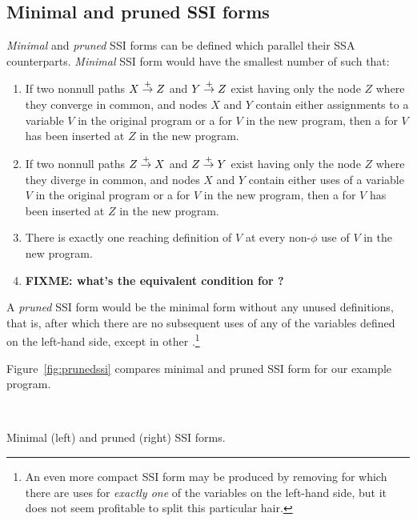 \documentclass[12pt,titlepage]{article}
\begin{document}
\subsection{Minimal and pruned SSI forms}
\emph{Minimal} and \emph{pruned} SSI forms can be defined which
parallel their SSA counterparts.  \emph{Minimal} SSI form would have the
smallest number of  such that:
\begin{enumerate}
\item If two nonnull paths $X \stackrel{+}{\rightarrow} Z$ and $Y \stackrel{+}{\rightarrow} Z$
exist having only the node $Z$ where they converge in common,
and nodes $X$ and $Y$ contain either assignments to a variable $V$ in the
original program or a \phisigfunction[or] for $V$ in the new program,
then a \phifunction{} for $V$ has been inserted at $Z$ in the new program.
\item If two nonnull paths $Z \stackrel{+}{\rightarrow} X$ and $Z \stackrel{+}{\rightarrow} Y$
exist having only the node $Z$ where they diverge in common,
and nodes $X$ and $Y$ contain either uses of a variable $V$ in the
original program or a \phisigfunction[or] for $V$ in the new program,
then a \sigfunction{} for $V$ has been inserted at $Z$ in the new program.
\item There is exactly one reaching definition of $V$ at every
non-$\phi$ use of $V$ in the new program.
\item \textbf{FIXME: what's the equivalent condition for ?}
\end{enumerate}

A \emph{pruned} SSI form would be the minimal form without any unused
definitions, that is,  after which there are no
subsequent uses of any of the variables defined on the left-hand side,
except in other .\footnote{An even more
compact SSI form may be produced by removing  for which
there are uses for \emph{exactly one} of the variables on the
left-hand side, but it does not seem profitable to split this
particular hair.}

Figure~\vref{fig:prunedssi} compares minimal and pruned SSI form for
our example program.
\begin{myfigure}
\begin{center}
 \vline\ 
\end{center}
\caption[Minimal and pruned SSI forms.]
{Minimal (left) and pruned (right) SSI forms.}
\label{fig:prunedssi}
\end{myfigure}
\end{document}
